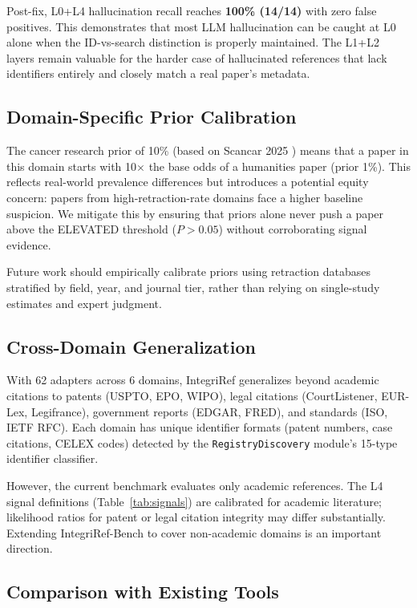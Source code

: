 \documentclass[sigconf,nonacm]{acmart}
\begin{document}
Post-fix, L0+L4 hallucination recall reaches \textbf{100\% (14/14)} with zero false positives.
This demonstrates that most LLM hallucination can be caught at L0 alone when the ID-vs-search distinction is properly maintained.
The L1+L2 layers remain valuable for the harder case of hallucinated references that lack identifiers entirely and closely match a real paper's metadata.

\subsection{Domain-Specific Prior Calibration}

The cancer research prior of 10\% (based on Scancar 2025 \cite{scancar2025}) means that a paper in this domain starts with 10$\times$ the base odds of a humanities paper (prior 1\%).
This reflects real-world prevalence differences but introduces a potential equity concern: papers from high-retraction-rate domains face a higher baseline suspicion.
We mitigate this by ensuring that priors alone never push a paper above the ELEVATED threshold ($P > 0.05$) without corroborating signal evidence.

Future work should empirically calibrate priors using retraction databases stratified by field, year, and journal tier, rather than relying on single-study estimates and expert judgment.

\subsection{Cross-Domain Generalization}

With 62 adapters across 6 domains, IntegriRef generalizes beyond academic citations to patents (USPTO, EPO, WIPO), legal citations (CourtListener, EUR-Lex, Legifrance), government reports (EDGAR, FRED), and standards (ISO, IETF RFC).
Each domain has unique identifier formats (patent numbers, case citations, CELEX codes) detected by the \texttt{RegistryDiscovery} module's 15-type identifier classifier.

However, the current benchmark evaluates only academic references.
The L4 signal definitions (Table~\ref{tab:signals}) are calibrated for academic literature; likelihood ratios for patent or legal citation integrity may differ substantially.
Extending IntegriRef-Bench to cover non-academic domains is an important direction.

\subsection{Comparison with Existing Tools}
\end{document}
